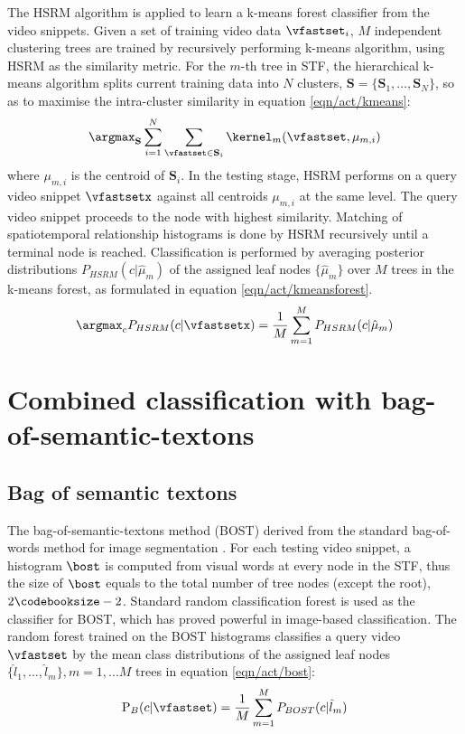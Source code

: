 The HSRM algorithm is applied to learn a k-means forest classifier from the video snippets. Given a set of training video data $\vfastset_i$, $M$ independent clustering trees are trained by recursively performing k-means algorithm, using HSRM as the similarity metric. 
For the $m$-th tree in STF, the hierarchical k-means algorithm splits current training data into $N$ clusters, $\mathbf{S} = \{\mathbf{S}_1,\dots,\mathbf{S}_N\}$, so as to maximise the intra-cluster similarity in equation \ref{eqn/act/kmeans}:
\begin{equation}
	\displaystyle\argmax_{\mathbf{S}} \displaystyle\sum_{i = 1}^{N}\sum_{\vfastset \in \mathbf{S}_{i}} \kernel_m(\vfastset, \mu_{m,i})
	\label{eqn/act/kmeans}
\end{equation}
where $\mu_{m,i}$ is the centroid of $\mathbf{S}_i$. In the testing stage, HSRM performs on a query video snippet $\vfastsetx$ against all centroids $\mu_{m,i}$ at the same level. The query video snippet proceeds to the node with highest similarity. Matching of spatiotemporal relationship histograms is done by HSRM recursively until a terminal node is reached. Classification is performed by averaging posterior distributions $P_{HSRM}(c|\hat{\mu}_{m})$ of the assigned leaf nodes $\{ \hat{\mu}_m \}$ over $M$ trees in the k-means forest, as formulated in equation \ref{eqn/act/kmeansforest}. 
\begin{equation}
	\displaystyle\argmax_{c}P_{HSRM}(c|\vfastsetx) = \frac{1}{M}\displaystyle\sum_{m=1}^{M}P_{HSRM}(c|\hat{\mu}_{m})
	\label{eqn/act/kmeansforest}
\end{equation}

\section{Combined classification with bag-of-semantic-textons}
\label{sec/act/combine}

\subsection{Bag of semantic textons}
The bag-of-semantic-textons method (BOST) derived from the standard bag-of-words method for image segmentation \cite{Shotton2008}. For each testing video snippet, a histogram $\bost$ is computed from visual words at every node in the STF, thus the size of $\bost$ equals to the total number of tree nodes (except the root), \ie $2\codebooksize - 2$.  
Standard random classification forest \cite{Breiman2001} is used as the classifier for BOST, which has proved powerful in image-based classification. 
The random forest trained on the BOST histograms classifies a query video $\vfastset$ by the mean class distributions of the assigned leaf nodes $\{\hat{l}_1,\dots,\hat{l}_{m}\}, m=1,...M$ trees in equation \ref{eqn/act/bost}:
\begin{equation}
\mathrm{P}_{B}(c|\vfastset) = \frac{1}{M}\displaystyle\sum_{m=1}^{M}P_{BOST}(c|\hat{l}_m)
\label{eqn/act/bost}
\end{equation}

